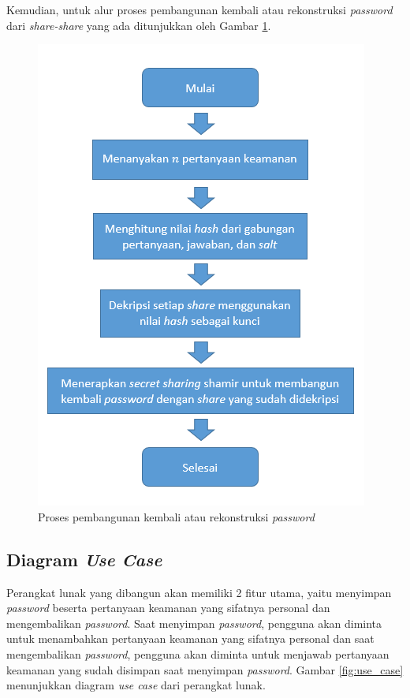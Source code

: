 Kemudian, untuk alur proses pembangunan kembali atau rekonstruksi \textit{password} dari \textit{share-share} yang ada ditunjukkan oleh Gambar \ref{fig:flowchart_reconstruct_secret}.

\begin{figure}[H]
	\centerline{\includegraphics[scale=0.65]{Gambar/flowchart_reconstruct}}
	\caption{Proses pembangunan kembali atau rekonstruksi \textit{password}}\label{fig:flowchart_reconstruct_secret}
\end{figure}

\subsection{Diagram \textit{Use Case}}

Perangkat lunak yang dibangun akan memiliki 2 fitur utama, yaitu menyimpan \textit{password} beserta pertanyaan keamanan yang sifatnya personal dan mengembalikan \textit{password}. Saat menyimpan \textit{password}, pengguna akan diminta untuk menambahkan pertanyaan keamanan yang sifatnya personal dan saat mengembalikan \textit{password}, pengguna akan diminta untuk menjawab pertanyaan keamanan yang sudah disimpan saat menyimpan \textit{password}. Gambar \ref{fig:use_case} menunjukkan diagram \textit{use case} dari perangkat lunak.

